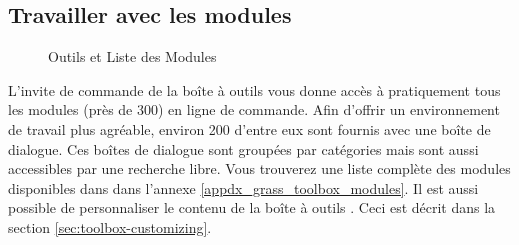 \subsection{Travailler avec les modules \grass}\label{grass_modules}
\begin{figure}[ht]
\centering
   \hspace{0.5cm}
\caption{Outils \grass et Liste des Modules \nixcaption}\label{fig:grass_modules}
\end{figure}

L'invite de commande de la boîte à outils \grass vous donne accès à pratiquement tous les modules \grass (près de 300) en ligne de commande. Afin d'offrir un environnement de travail plus agréable, environ 200 d'entre eux sont fournis avec une boîte de dialogue. Ces boîtes de dialogue sont groupées par catégories mais sont aussi accessibles par une recherche libre. Vous trouverez une liste complète des modules \grass disponibles dans \qg \CURRENT dans l'annexe \ref{appdx_grass_toolbox_modules}. Il est aussi possible de personnaliser le contenu de la boîte à outils \grass. Ceci est décrit dans la section \ref{sec:toolbox-customizing}.

